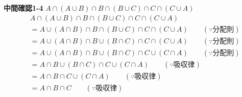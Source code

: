 \documentclass[dvipdfmx,10pt, a4j]{jarticle}
\theoremstyle{definition}
\begin{document}
    \newpage
    \noindent
    \textbf{中間確認1-4} $A \cap (A \cup B) \cap B \cap (B \cup C) \cap C \cap (C \cup A)$\\
    \begin{align*}
        &A \cap (A \cup B) \cap B \cap (B \cup C) \cap C \cap (C \cup A)\\
        &=A \cup (A \cap B) \cap B \cap (B \cup C) \cap C \cap (C \cup A) \qquad (\because 分配則)\\
        &=A \cup (A \cap B) \cap B \cup (B \cap C) \cap C \cap (C \cup A) \qquad (\because 分配則)\\
        &=A \cup (A \cap B) \cap B \cup (B \cap C) \cap C \cup (C \cap A) \qquad (\because 分配則)\\
        &=A \cap B \cup (B \cap C) \cap C \cup (C \cap A) \qquad (\because 吸収律)\\
        &=A \cap B \cap C \cup (C \cap A) \qquad (\because 吸収律)\\
        &=A \cap B \cap C \qquad (\because 吸収律)\\
    \end{align*}
\end{document}
